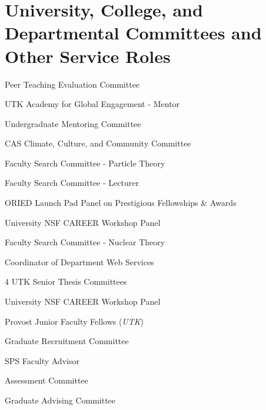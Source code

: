 \documentclass[11pt,letterpaper]{article}
\begin{document}
\section*{University, College, and Departmental Committees and Other Service Roles}

  \begin{itemizetighter}

    \item Peer Teaching Evaluation Committee 

    \item UTK Academy for Global Engagement - Mentor 

    \item Undergraduate Mentoring Committee 

    \item CAS Climate, Culture, and Community Committee 

    \item Faculty Search Committee - Particle Theory 
    \item Faculty Search Committee - Lecturer 

    \item ORIED Launch Pad Panel on Prestigious Fellowships \& Awards 
    \item University NSF CAREER Workshop Panel 
    \item Faculty Search Committee - Nuclear Theory 

    \item Coordinator of Department Web Services 

    \item 4 UTK Senior Thesis Committees 

    \item University NSF CAREER Workshop Panel 

    \item Provost Junior Faculty Fellows (\emph{UTK}) 

    \item Graduate Recruitment Committee  

    \item SPS Faculty Advisor  

    \item Assessment Committee  

    \item Graduate Advising Committee 


\end{itemizetighter}
\end{document}
